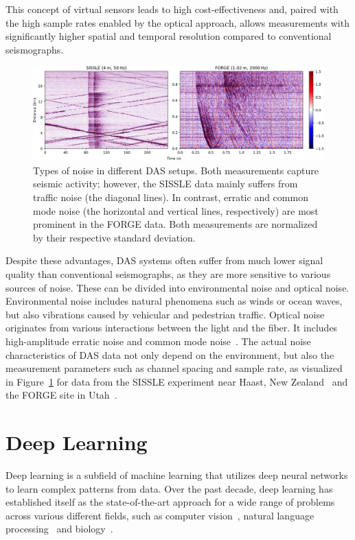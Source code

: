 This concept of virtual sensors leads to high cost-effectiveness and, paired with the high sample rates enabled by the optical approach, allows measurements with significantly higher spatial and temporal resolution compared to conventional seismographs.
\begin{figure}[b!]
    \includegraphics[width=\textwidth]{img/fig_2.2.png}
    \caption{
        Types of noise in different DAS setups.
        Both measurements capture seismic activity; however, the SISSLE data mainly suffers from traffic noise (the diagonal lines).
        In contrast, erratic and common mode noise (the horizontal and vertical lines, respectively) are most prominent in the FORGE data.
        Both measurements are normalized by their respective standard deviation.
    }\label{fig:das-noise}
\end{figure}
Despite these advantages, DAS systems often suffer from much lower signal quality than conventional seismographs, as they are more sensitive to various sources of noise.
These can be divided into environmental noise and optical noise.
Environmental noise includes natural phenomena such as winds or ocean waves, but also vibrations caused by vehicular and pedestrian traffic.
Optical noise originates from various interactions between the light and the fiber.
It includes high-amplitude erratic noise and common mode noise~\cite{IDF}.
The actual noise characteristics of DAS data not only depend on the environment, but also the measurement parameters such as channel spacing and sample rate, as visualized in Figure~\ref{fig:das-noise} for data from the SISSLE experiment near Haast, New Zealand~\cite{SISSLE} and the FORGE site in Utah~\cite{FORGE}.

\section{Deep Learning}

Deep learning is a subfield of machine learning that utilizes deep neural networks to learn complex patterns from data. 
Over the past decade, deep learning has established itself as the state-of-the-art approach for a wide range of problems across various different fields, such as computer vision~\cite{AlexNet}, natural language processing~\cite{GPT3} and biology~\cite{AlphaFold}.

